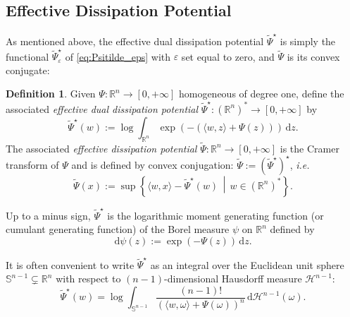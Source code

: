 \documentclass[reqno]{amsart}
\theoremstyle{definition}
\newtheorem{definition}[theorem]{Definition}
\begin{document}
\subsection{Effective Dissipation Potential}

As mentioned above, the effective dual dissipation potential ${\widetilde{\Psi}}^{\star}$ is simply the functional ${\widetilde{\Psi}}_{\varepsilon}^{\star}$ of \eqref{eq:Psitilde_eps} with ${\varepsilon}$ set equal to zero, and ${\widetilde{\Psi}}$ is its convex conjugate:

\begin{definition}
	Given $\Psi \colon {\mathbb{R}}^{n} \to [0, +\infty]$ homogeneous of degree one, define the associated \emph{effective dual dissipation potential} ${\widetilde{\Psi}}^{\star} \colon ({\mathbb{R}}^{n})^{\ast} \to [0, + \infty]$ by
	\begin{equation}
		\label{eq:EDDP}
		{\widetilde{\Psi}}^{\star} (w) := \log \int_{{\mathbb{R}}^{n}} \exp ( - (\langle w, z \rangle + \Psi(z)) ) \, {\mathrm{d}} z.
	\end{equation}
	The associated \emph{effective dissipation potential} ${\widetilde{\Psi}} \colon {\mathbb{R}}^{n} \to [0, + \infty]$ is the Cramer transform of $\Psi$ and is defined by convex conjugation:  ${\widetilde{\Psi}} := ({\widetilde{\Psi}}^{\star})^{\star}$, \emph{i.e.}
	\begin{equation}
		\label{eq:EDP}
		{\widetilde{\Psi}} (x) := \sup \left\{ \langle w, x \rangle - {\widetilde{\Psi}}^{\star} (w) \,\middle|\, w \in ({\mathbb{R}}^{n})^{\ast} \right\}.
	\end{equation}
\end{definition}

Up to a minus sign, ${\widetilde{\Psi}}^{\star}$ is the logarithmic moment generating function (or cumulant generating function) of the Borel measure $\psi$ on ${\mathbb{R}}^{n}$ defined by
\begin{equation}
	\label{eq:psi_measure}
	{\mathrm{d}} \psi(z) := \exp (- \Psi(z)) \, {\mathrm{d}} z.
\end{equation}

It is often convenient to write ${\widetilde{\Psi}}^{\star}$ as an integral over the Euclidean unit sphere $\mathbb{S}^{n - 1} \subsetneq {\mathbb{R}}^{n}$ with respect to $(n - 1)$-dimensional Hausdorff measure $\mathcal{H}^{n - 1}$:
\begin{equation}
	\label{eq:EDDP-Spherical}
	{\widetilde{\Psi}}^{\star} (w) = \log \int_{\mathbb{S}^{n - 1}} \frac{(n - 1)!}{( \langle w, \omega \rangle + \Psi(\omega) )^{n}} \, {\mathrm{d}} \mathcal{H}^{n - 1} (\omega).
\end{equation}
\end{document}
